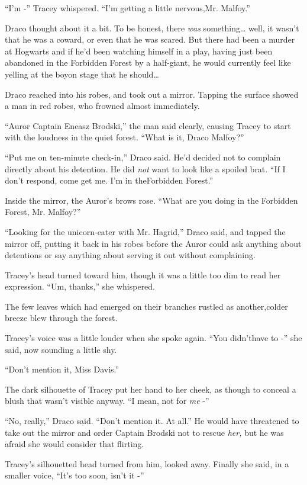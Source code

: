 ``I'm -'' Tracey whispered. ``I'm getting a little nervous,Mr. Malfoy.''

Draco thought about it a bit. To be honest, there \emph{was} something\ldots{} well, it wasn't that he was a coward, or even that he was scared. But there had been a murder at Hogwarts and if he'd been watching himself in a play, having just been abandoned in the Forbidden Forest by a half-giant, he would currently feel like yelling at the boyon stage that he should\ldots{}

Draco reached into his robes, and took out a mirror. Tapping the surface showed a man in red robes, who frowned almost immediately.

``Auror Captain Eneasz Brodski,'' the man said clearly, causing Tracey to start with the loudness in the quiet forest. ``What is it, Draco Malfoy?''

``Put me on ten-minute check-in,'' Draco said. He'd decided not to complain directly about his detention. He did \emph{not} want to look like a spoiled brat. ``If I don't respond, come get me. I'm in theForbidden Forest.''

Inside the mirror, the Auror's brows rose. ``What are you doing in the Forbidden Forest, Mr. Malfoy?''

``Looking for the unicorn-eater with Mr. Hagrid,'' Draco said, and tapped the mirror off, putting it back in his robes before the Auror could ask anything about detentions or say anything about serving it out without complaining.

Tracey's head turned toward him, though it was a little too dim to read her expression. ``Um, thanks,'' she whispered.

The few leaves which had emerged on their branches rustled as another,colder breeze blew through the forest.

Tracey's voice was a little louder when she spoke again. ``You didn'thave to -'' she said, now sounding a little shy.

``Don't mention it, Miss Davis.''

The dark silhouette of Tracey put her hand to her cheek, as though to conceal a blush that wasn't visible anyway. ``I mean, not for \emph{me} -''

``No, really,'' Draco said. ``Don't mention it. At all.'' He would have threatened to take out the mirror and order Captain Brodski not to rescue \emph{her,} but he was afraid she would consider that flirting.

Tracey's silhouetted head turned from him, looked away. Finally she said, in a smaller voice, ``It's too soon, isn't it -''

